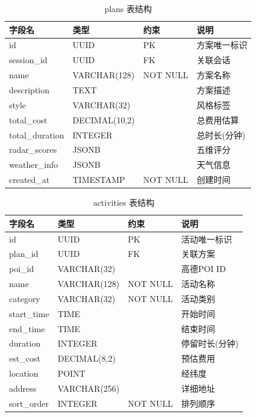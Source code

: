 \documentclass[12pt,a4paper]{ctexart}
\begin{document}
\begin{table}[H]
\centering
\caption{plans 表结构}
\label{tab:plans-table}
\renewcommand{\arraystretch}{1.2}
{\small
\begin{tabular}{p{3.5cm} p{3cm} p{1.5cm} p{4cm}}
\toprule
\textbf{字段名} & \textbf{类型} & \textbf{约束} & \textbf{说明} \\
\midrule
id & UUID & PK & 方案唯一标识 \\
session\_id & UUID & FK & 关联会话 \\
name & VARCHAR(128) & NOT NULL & 方案名称 \\
description & TEXT & & 方案描述 \\
style & VARCHAR(32) & & 风格标签 \\
total\_cost & DECIMAL(10,2) & & 总费用估算 \\
total\_duration & INTEGER & & 总时长(分钟) \\
radar\_scores & JSONB & & 五维评分 \\
weather\_info & JSONB & & 天气信息 \\
created\_at & TIMESTAMP & NOT NULL & 创建时间 \\
\bottomrule
\end{tabular}
}
\end{table}

\begin{table}[H]
\centering
\caption{activities 表结构}
\label{tab:activities-table}
\renewcommand{\arraystretch}{1.2}
{\small
\begin{tabular}{p{3.5cm} p{3cm} p{1.5cm} p{4cm}}
\toprule
\textbf{字段名} & \textbf{类型} & \textbf{约束} & \textbf{说明} \\
\midrule
id & UUID & PK & 活动唯一标识 \\
plan\_id & UUID & FK & 关联方案 \\
poi\_id & VARCHAR(32) & & 高德POI ID \\
name & VARCHAR(128) & NOT NULL & 活动名称 \\
category & VARCHAR(32) & NOT NULL & 活动类别 \\
start\_time & TIME & & 开始时间 \\
end\_time & TIME & & 结束时间 \\
duration & INTEGER & & 停留时长(分钟) \\
est\_cost & DECIMAL(8,2) & & 预估费用 \\
location & POINT & & 经纬度 \\
address & VARCHAR(256) & & 详细地址 \\
sort\_order & INTEGER & NOT NULL & 排列顺序 \\
\bottomrule
\end{tabular}
}
\end{table}
\end{document}
